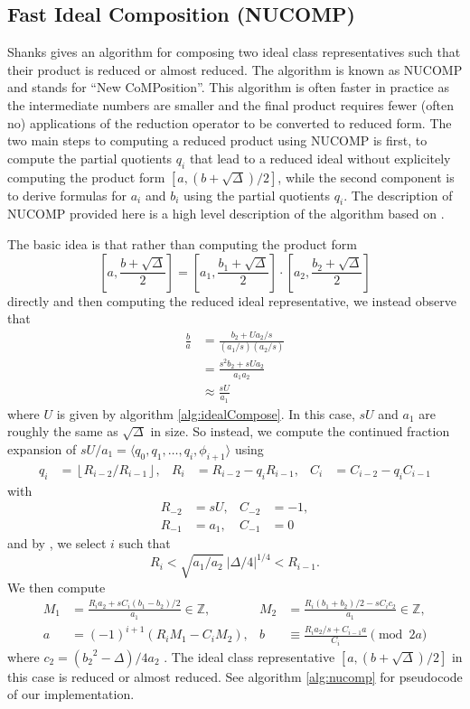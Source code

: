 \documentclass{ucalgthes1}
\theoremstyle{plain}
\theoremstyle{definition}
\newcommand{\ZZ}{\mathbb{Z}}
\newcommand{\floor}[1]{\left\lfloor #1 \right\rfloor}
\begin{document}
\subsection{Fast Ideal Composition (NUCOMP)}\label{subsec:nucomp}

Shanks gives an algorithm for composing two ideal class representatives such that their product is reduced or almost reduced.  The algorithm is known as NUCOMP and stands for ``New CoMPosition''.  This algorithm is often faster in practice as the intermediate numbers are smaller and the final product requires fewer (often no) applications of the reduction operator to be converted to reduced form.  The two main steps to computing a reduced product using NUCOMP is first, to compute the partial quotients $q_i$ that lead to a reduced ideal without explicitely computing the product form $[a,(b+\sqrt\Delta)/2]$, while the second component is to derive formulas for $a_i$ and $b_i$ using the partial quotients $q_i$.  The description of NUCOMP provided here is a high level description of the algorithm based on \cite[pp.119-123]{Jac09}.

The basic idea is that rather than computing the product form
\[
	\left[a, \frac{b+\sqrt\Delta}{2} \right] = \left[a_1, \frac{b_1+\sqrt\Delta}{2} \right] \cdot \left[a_2, \frac{b_2+\sqrt\Delta}{2} \right]
\]
directly and then computing the reduced ideal representative, we instead observe that
\begin{align*}
	\frac{b}{a} &= \frac{b_2 + Ua_2/s}{(a_1/s)(a_2/s)} \\
	&= \frac{s^2 b_2+sUa_2}{a_1a_2} \\
	&\approx \frac{sU}{a_1}
\end{align*}
where $U$ is given by algorithm \ref{alg:idealCompose}.  In this case, $sU$ and $a_1$ are roughly the same as $\sqrt\Delta$ in size.  So instead, we compute the continued fraction expansion of $sU/a_1 = \langle q_0, q_1, \dots, q_i, \phi_{i+1} \rangle$ using
\begin{align*}
	q_i &= \floor{R_{i-2} / R_{i-1}}, &
	R_i &= R_{i-2} - q_i R_{i-1}, &
	C_i &= C_{i-2} - q_i C_{i-1}
\end{align*}
with
\begin{align*}
	R_{-2} &= sU,  & C_{-2} &= -1, \\
	R_{-1} &= a_1, & C_{-1} &= 0
\end{align*}
and by \cite[Theorem 5.43]{Jac09}, we select $i$ such that
\[
	R_i < \sqrt{a_1/a_2} ~ |\Delta/4|^{1/4} < R_{i-1}.
\]
We then compute
\begin{align*}
	M_1 &= \frac{R_i a_2 + sC_i(b_1-b_2)/2}{a_1}  \in \ZZ, &
	M_2 &= \frac{R_i (b_1+b_2)/2 - s C_i c_2}{a_1} \in \ZZ, \\
	a &= (-1)^{i+1} (R_i M_1  - C_i M_2), &
	b &\equiv \frac{R_i a_2 /s + C_{i-1} a}{C_i} \pmod{2a}
\end{align*}
where $c_2 = ({b_2}^2-\Delta)/4a_2$ \cite[Equation 5.44]{Jac09}.  The ideal class representative $[a, (b+\sqrt\Delta)/2]$ in this case is reduced or almost reduced.  See algorithm \ref{alg:nucomp} for pseudocode of our implementation.
\end{document}
